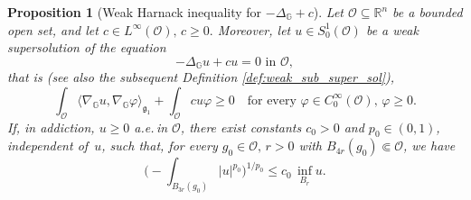 \documentclass[11pt]{amsart}
\numberwithin{equation}{section} %
\newtheorem{prop}[teo]{Proposition}
\theoremstyle{definition}
\def\R{\mathbb{R}}
\begin{document}
\begin{prop}[Weak Harnack inequality for $-\Delta_\mathbb{G}+c$] \label{prop:WHarnack}
 Let $\mathcal{O}\subseteq\R^n$ be a bounded open set, and let 
 $c\in L^\infty(\mathcal{O}),\,c\geq 0.$
 Moreover, let $u\in S_0^1(\mathcal{O})$ be a \emph{weak supersolution}
 of the equation 
 \begin{equation} \label{eq:PDEOrderzeroHarnack}
  \text{$-\Delta_\mathbb{G}u+cu = 0$ in $\mathcal{O}$},
  \end{equation}
 that is
 \emph{(}see also the subsequent Definition \ref{def:weak_sub_super_sol}\emph{)},
 $$\int_\mathcal{O}\langle\nabla_\mathbb{G}u,\nabla_\mathbb{G}\varphi\rangle_{\mathfrak{g}_{1}}
 +\int_\mathcal{O} cu\varphi\geq 0\quad\text{
 for every $\varphi\in C_0^\infty(\mathcal{O}),\,\varphi\geq 0$}.$$
 If, in addiction, $u\geq 0$ a.e.\,in $\mathcal{O}$, there exist
 constants $c_0 > 0$ and $p_0\in (0,1)$,
 \emph{independent of~$u$}, such that,
 for every $g_0\in\mathcal{O},\,r > 0$ with $B_{4r}(g_0)\Subset\mathcal{O}$, we have
 \begin{equation} \label{eq:HarnackInequ}
  \Big(-\!\!\!\!\!\!\!\int_{B_{3r}(g_0)}|u|^{p_0}\Big)^{1/p_0}\leq c_0\,\inf_{B_{r}}u.
 \end{equation}
\end{prop}
\end{document}
